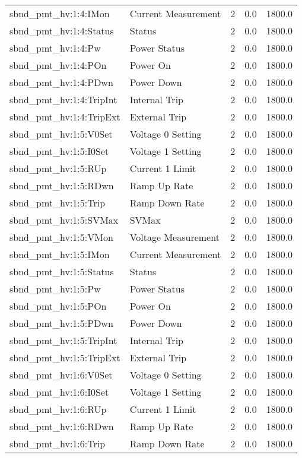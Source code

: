 \begin{center}
\begin{longtable}{l | l l l l }
sbnd\_pmt\_hv:1:4:IMon & Current Measurement & 2 & 0.0 & 1800.0\\ 
sbnd\_pmt\_hv:1:4:Status & Status & 2 & 0.0 & 1800.0\\ 
sbnd\_pmt\_hv:1:4:Pw & Power Status & 2 & 0.0 & 1800.0\\ 
sbnd\_pmt\_hv:1:4:POn & Power On & 2 & 0.0 & 1800.0\\ 
sbnd\_pmt\_hv:1:4:PDwn & Power Down & 2 & 0.0 & 1800.0\\ 
sbnd\_pmt\_hv:1:4:TripInt & Internal Trip & 2 & 0.0 & 1800.0\\ 
sbnd\_pmt\_hv:1:4:TripExt & External Trip & 2 & 0.0 & 1800.0\\ 
sbnd\_pmt\_hv:1:5:V0Set & Voltage 0 Setting & 2 & 0.0 & 1800.0\\ 
sbnd\_pmt\_hv:1:5:I0Set & Voltage 1 Setting & 2 & 0.0 & 1800.0\\ 
sbnd\_pmt\_hv:1:5:RUp & Current 1 Limit & 2 & 0.0 & 1800.0\\ 
sbnd\_pmt\_hv:1:5:RDwn & Ramp Up Rate & 2 & 0.0 & 1800.0\\ 
sbnd\_pmt\_hv:1:5:Trip & Ramp Down Rate & 2 & 0.0 & 1800.0\\ 
sbnd\_pmt\_hv:1:5:SVMax & SVMax & 2 & 0.0 & 1800.0\\ 
sbnd\_pmt\_hv:1:5:VMon & Voltage Measurement & 2 & 0.0 & 1800.0\\ 
sbnd\_pmt\_hv:1:5:IMon & Current Measurement & 2 & 0.0 & 1800.0\\ 
sbnd\_pmt\_hv:1:5:Status & Status & 2 & 0.0 & 1800.0\\ 
sbnd\_pmt\_hv:1:5:Pw & Power Status & 2 & 0.0 & 1800.0\\ 
sbnd\_pmt\_hv:1:5:POn & Power On & 2 & 0.0 & 1800.0\\ 
sbnd\_pmt\_hv:1:5:PDwn & Power Down & 2 & 0.0 & 1800.0\\ 
sbnd\_pmt\_hv:1:5:TripInt & Internal Trip & 2 & 0.0 & 1800.0\\ 
sbnd\_pmt\_hv:1:5:TripExt & External Trip & 2 & 0.0 & 1800.0\\ 
sbnd\_pmt\_hv:1:6:V0Set & Voltage 0 Setting & 2 & 0.0 & 1800.0\\ 
sbnd\_pmt\_hv:1:6:I0Set & Voltage 1 Setting & 2 & 0.0 & 1800.0\\ 
sbnd\_pmt\_hv:1:6:RUp & Current 1 Limit & 2 & 0.0 & 1800.0\\ 
sbnd\_pmt\_hv:1:6:RDwn & Ramp Up Rate & 2 & 0.0 & 1800.0\\ 
sbnd\_pmt\_hv:1:6:Trip & Ramp Down Rate & 2 & 0.0 & 1800.0\\ 

\end{longtable}
\end{center}
